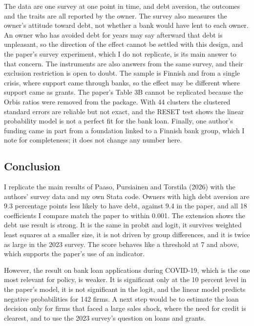\documentclass[preprint,letterpaper,11pt,authoryear]{elsarticle}
\begin{document}
The data are one survey at one point in time, and debt aversion, the outcomes and the traits are all reported by the owner. The survey also measures the owner's attitude toward debt, not whether a bank would have lent to each owner. An owner who has avoided debt for years may say afterward that debt is unpleasant, so the direction of the effect cannot be settled with this design, and the paper's survey experiment, which I do not replicate, is its main answer to that concern. The instruments are also answers from the same survey, and their exclusion restriction is open to doubt. The sample is Finnish and from a single crisis, where support came through banks, so the effect may be different where support came as grants. The paper's Table 3B cannot be replicated because the Orbis ratios were removed from the package. With 44 clusters the clustered standard errors are reliable but not exact, and the RESET test shows the linear probability model is not a perfect fit for the bank loan. Finally, one author's funding came in part from a foundation linked to a Finnish bank group, which I note for completeness; it does not change any number here.

\subsection{Conclusion}

I replicate the main results of Paaso, Pursiainen and Torstila (2026) with the authors' survey data and my own Stata code. Owners with high debt aversion are 9.3 percentage points less likely to have debt, against 9.4 in the paper, and all 18 coefficients I compare match the paper to within 0.001. The extension shows the debt use result is strong. It is the same in probit and logit, it survives weighted least squares at a smaller size, it is not driven by group differences, and it is twice as large in the 2023 survey. The score behaves like a threshold at 7 and above, which supports the paper's use of an indicator.

However, the result on bank loan applications during COVID-19, which is the one most relevant for policy, is weaker. It is significant only at the 10 percent level in the paper's model, it is not significant in the logit, and the linear model predicts negative probabilities for 142 firms. A next step would be to estimate the loan decision only for firms that faced a large sales shock, where the need for credit is clearest, and to use the 2023 survey's question on loans and grants.
\end{document}
